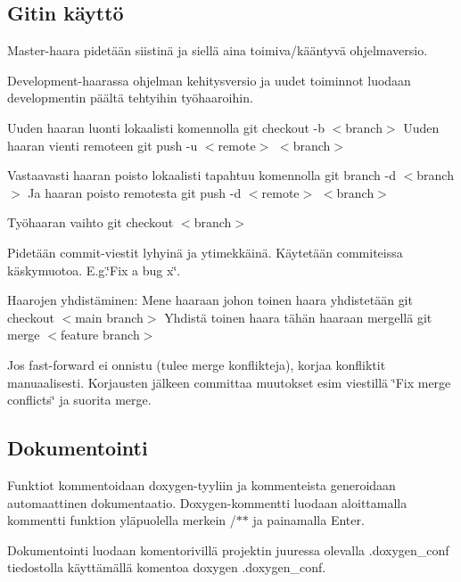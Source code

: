 \subsection*{Gitin käyttö}

Master-\/haara pidetään siistinä ja siellä aina toimiva/kääntyvä ohjelmaversio.

Development-\/haarassa ohjelman kehitysversio ja uudet toiminnot luodaan developmentin päältä tehtyihin työhaaroihin.

Uuden haaran luonti lokaalisti komennolla {\ttfamily git checkout -\/b $<$branch$>$} Uuden haaran vienti remoteen {\ttfamily git push -\/u $<$remote$>$ $<$branch$>$}

Vastaavasti haaran poisto lokaalisti tapahtuu komennolla {\ttfamily git branch -\/d $<$branch$>$} Ja haaran poisto remotesta {\ttfamily git push -\/d $<$remote$>$ $<$branch$>$}

Työhaaran vaihto {\ttfamily git checkout $<$branch$>$}

Pidetään commit-\/viestit lyhyinä ja ytimekkäinä. Käytetään commiteissa käskymuotoa. E.\-g.\char`\"{}\-Fix a bug x\char`\"{}.

Haarojen yhdistäminen\-: Mene haaraan johon toinen haara yhdistetään {\ttfamily git checkout $<$main branch$>$} Yhdistä toinen haara tähän haaraan mergellä {\ttfamily git merge $<$feature branch$>$}

Jos fast-\/forward ei onnistu (tulee merge konflikteja), korjaa konfliktit manuaalisesti. Korjausten jälkeen committaa muutokset esim viestillä \char`\"{}\-Fix merge conflicts\char`\"{} ja suorita merge.

\subsection*{Dokumentointi}

Funktiot kommentoidaan doxygen-\/tyyliin ja kommenteista generoidaan automaattinen dokumentaatio. Doxygen-\/kommentti luodaan aloittamalla kommentti funktion yläpuolella merkein {\ttfamily /$\ast$$\ast$} ja painamalla {\ttfamily Enter}.

Dokumentointi luodaan komentorivillä projektin juuressa olevalla .doxygen\-\_\-conf tiedostolla käyttämällä komentoa {\ttfamily doxygen .doxygen\-\_\-conf}. 